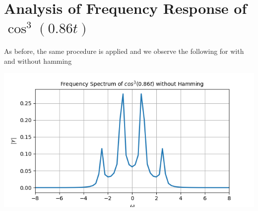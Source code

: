 \documentclass[12pt, a4paper]{report}
\begin{document}
\section*{Analysis of Frequency Response of $\cos^3 (0.86t)$}
As before, the same procedure is applied and we observe the following for with and without hamming
\begin{center}
	\includegraphics[scale=0.8]{Figure_10.png} 
	\label{fig:rawdata}
\end{center}
\clearpage
\end{document}
